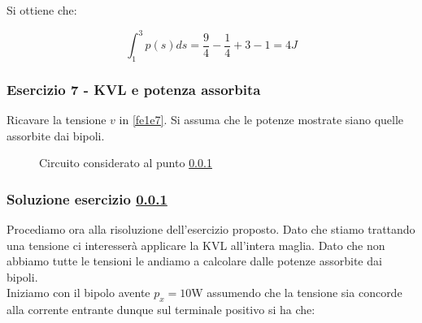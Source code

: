 \documentclass[../main.tex]{subfiles}
\begin{document}
Si ottiene che:

\begin{equation}
	\int_1^3 p(s)ds = \frac{9}{4} - \frac{1}{4} + 3 - 1 = 4 \unit{J}
\end{equation}


\newpage
\vspace*{1.5cm}
\subsubsection{Esercizio 7 - KVL e potenza assorbita}
\label{e1e7}


Ricavare la tensione $v$ in \autoref{fe1e7}. Si assuma che le potenze mostrate siano quelle assorbite dai bipoli.


\begin{figure}[h!]
\begin{center}


\end{center}
\caption{Circuito considerato al punto \ref{e1e7}}	
\label{fe1e7}
\end{figure}

\subsubsection*{Soluzione esercizio \ref{e1e7}}

Procediamo ora alla risoluzione dell'esercizio proposto. Dato che stiamo trattando una tensione ci interesserà applicare la KVL all'intera maglia. Dato che non abbiamo tutte le tensioni le andiamo a calcolare dalle potenze assorbite dai bipoli.\\

Iniziamo con il bipolo avente $p_x = 10$W assumendo che la tensione sia concorde alla corrente entrante dunque sul terminale positivo si ha che:
\end{document}
